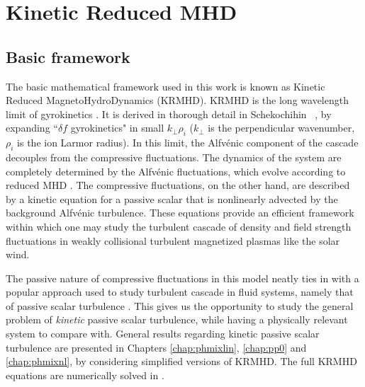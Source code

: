     \section{Kinetic Reduced MHD}
    \label{intro:sec:krmhd}
    \subsection{Basic framework}
    
    The basic mathematical framework used in this work is
    known as Kinetic Reduced MagnetoHydroDynamics (KRMHD). KRMHD is the
    long wavelength limit of gyrokinetics \cite{rutherford68, taylor68, catto78, antonsen80,
    catto81, frieman82, dubin83, lee83, lee87, hahm88, howes06, tome}. It is derived in
    thorough detail in Schekochihin \etal\ \cite{tome}, by expanding ``$\delta f$ gyrokinetics"  in small $k_\perp \rho_i$ ($k_\perp$ is the perpendicular wavenumber,
    $\rho_i$ is the ion Larmor radius). In this limit, the Alfv\'{e}nic component of
    the cascade
    decouples from the compressive fluctuations. The dynamics of the system are completely
    determined by the Alfv\'{e}nic fluctuations, which evolve according to reduced MHD
    \cite{kadomtsev74, strauss76}. The compressive
    fluctuations, on the other hand, are described by a kinetic equation for a passive
    scalar that is nonlinearly advected by the background Alfv\'{e}nic turbulence. These
    equations provide an efficient framework within which one may study the turbulent cascade
    of density and field strength fluctuations in weakly collisional turbulent magnetized
    plasmas like the solar wind. 
    
    The passive nature of compressive fluctuations in this
    model neatly ties in with a popular approach used to study turbulent cascade in fluid
    systems, namely that of passive scalar turbulence \cite{obukhov49, corrsin51, batchelor59,
    kraichnan68, kraichnan74, kraichnan94,
    monin75, aref84, chaiken87, ottino89, zeldovich88, ott88, ott89, antonsen91, ramashankar91,
    solomon93, sreenivasan91,
    vanatta91, pierrehumbert94, antonsen95, frisch95, sreenivasan96, boratav97, lesieur97, shraiman00,
    warhaft00}. This gives us the opportunity to study the general problem of
    \textit{kinetic} passive
    scalar turbulence, while having a physically relevant system to compare with.
    General results regarding kinetic passive scalar turbulence are presented in Chapters
    \ref{chap:phmixlin}, \ref{chap:pp0} and \ref{chap:phmixnl}, by considering simplified
    versions of KRMHD. The full KRMHD equations are
    numerically solved in .

